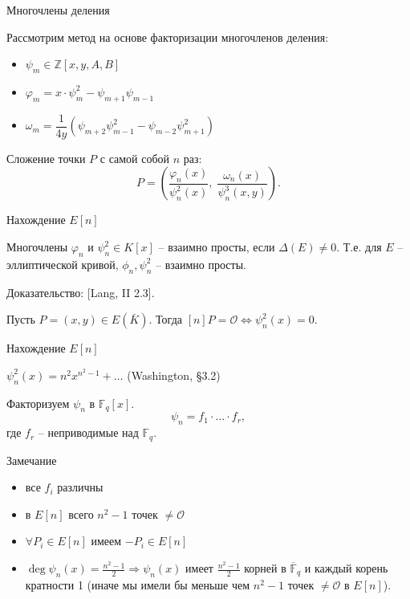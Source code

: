 \documentclass{beamer}
\begin{document}
\begin{frame}{Многочлены деления}
    \vspace{1em}
    
    Рассмотрим метод на основе факторизации многочленов деления:
    
    \begin{itemize}
        \item $\psi_m \in \mathbb{Z}\left[x,y,A,B\right]$
        \item $\varphi_m = x \cdot \psi_m^2 - \psi_{m + 1} \psi_{m - 1}$
        
        \item $\omega_m = \dfrac{1}{{4y}}\left( {{\psi_{m + 2}}\psi_{m - 1}^2 - {\psi_{m - 2}}\psi_{m + 1}^2} \right)$
    \end{itemize}
    Сложение точки $P$ с самой собой $n$ раз:
    \begin{equation*}
        [n] P = \left( {\frac{{{\varphi _n}(x)}}{{\psi _n^2(x)}},\;\frac{{{\omega _n}( x )}}{{\psi _n^3(x,y)}}} \right).
    \end{equation*}
\end{frame}

\begin{frame}{Нахождение $E[n]$}
\begin{lemma}
Многочлены ${\varphi _n}$ и $\psi _n^2 \in K\left[ x \right]$ -- взаимно просты, если $\Delta (E) \ne 0$. Т.е. для $E$ -- эллиптической кривой, ${\phi _n}, \psi _n^2$ -- взаимно просты.
\end{lemma}
\structure{$\triangleleft$} Доказательство: [Lang, II 2.3].\structure{$\triangleright$}

\begin{corollary}
Пусть $P = (x,y) \in E(\bar{K})$. Тогда $[n] P = \mathcal{O} \Leftrightarrow \psi_n^2(x) = 0$.
\end{corollary}
\end{frame}

\begin{frame}{Нахождение $E[n]$}
    \begin{center}
       $\psi_n^2(x) = {n^2}{x^{{n^2} - 1}} +  \ldots$ \hfill {\small(Washington, \S3.2)}
    \end{center}

Факторизуем $\psi_n$ в $\mathbb{F}_q[x]$.
\[\psi_n = f_1 \cdot \ldots \cdot f_r,\]
где $f_r$ -- неприводимые над $\mathbb{F}_q$.
\begin{block}{Замечание}
\begin{itemize}
    \item все $f_i$ различны
    \item в $E[n]$ всего ${n^2} - 1$ точек $\neq \mathcal{O}$
    \item $\forall P_i \in E[n]$ имеем $-P_i \in E[n]$
    \item $\deg {\psi _n}( x ) = \frac{{{n^2} - 1}}{2} \Rightarrow {\psi _n}( x )$ имеет $\frac{{{n^2} - 1}}{2}$ корней в $\overline{\mathbb{F}}_q$ и каждый корень кратности 1 (иначе мы имели бы меньше чем ${n^2} - 1$ точек $ \ne \mathcal{O}$ в $E[n]$). 
\end{itemize}
\end{block}
\end{frame}
\end{document}
